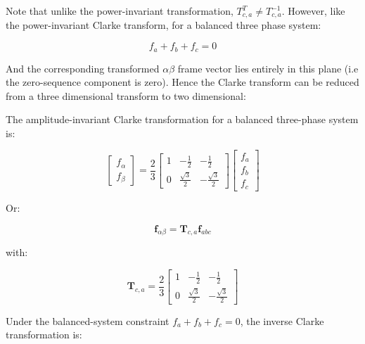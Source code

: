 \documentclass{article}
\begin{document}
Note that unlike the power-invariant transformation, $T_{c,a}^T \neq T_{c,a}^{-1}$. However, like the power-invariant Clarke transform, for a balanced three phase system:

\begin{equation}
    f_a + f_b + f_c = 0
\end{equation}

And the corresponding transformed $\alpha\beta$ frame vector lies entirely in this plane (i.e the zero-sequence component is zero). Hence the Clarke transform can be reduced from a three dimensional transform to two dimensional:

The amplitude-invariant Clarke transformation for a balanced three-phase system is:

\begin{equation}
    \begin{bmatrix}
        f_{\alpha} \\
        f_{\beta}
    \end{bmatrix}
    =
    \frac{2}{3}
    \begin{bmatrix}
        1 & -\frac{1}{2} & -\frac{1}{2} \\
        0 & \frac{\sqrt{3}}{2} & -\frac{\sqrt{3}}{2}
    \end{bmatrix}
    \begin{bmatrix}
        f_a \\
        f_b \\
        f_c
    \end{bmatrix}
\end{equation}

Or:

\begin{equation}
    \mathbf{f}_{\alpha\beta}
    =
    \mathbf{T}_{c,a}\mathbf{f}_{abc}
\end{equation}

with:

\begin{equation}
    \mathbf{T}_{c,a}
    =
    \frac{2}{3}
    \begin{bmatrix}
        1 & -\frac{1}{2} & -\frac{1}{2} \\
        0 & \frac{\sqrt{3}}{2} & -\frac{\sqrt{3}}{2}
    \end{bmatrix}
\end{equation}

Under the balanced-system constraint $f_a+f_b+f_c=0$, the inverse Clarke transformation is:
\end{document}

